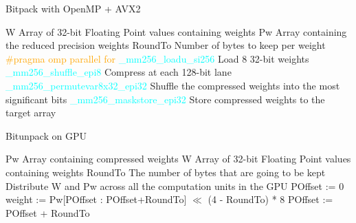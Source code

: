 
\begin{algorithm}%
\caption{Bitpack with OpenMP + AVX2}
\label{alg:bitpack_omp_avx}
{\fontsize{9}{9}\selectfont
\begin{algorithmic}[1]
    \State W
    \Comment Array of 32-bit Floating Point values containing weights
    \State Pw
    \Comment Array containing the reduced precision weights
    \State RoundTo
    \Comment Number of bytes to keep per weight
    \State \textcolor{orange} {\#pragma omp parallel for} %
        \State \textcolor{cyan}{\_mm256\_loadu\_si256}
        \Comment Load 8 32-bit weights 
        \State \textcolor{cyan}{\_mm256\_shuffle\_epi8}
        \Comment Compress at each 128-bit lane
        \State \textcolor{cyan}{\_mm256\_permutevar8x32\_epi32}
        \Comment Shuffle the compressed weights into the most significant bits
        \State \textcolor{cyan}{\_mm256\_maskstore\_epi32}
        \Comment Store compressed weights to the target array
    \EndFor
\end{algorithmic}
}
\end{algorithm}

\begin{algorithm}%
\caption{Bitunpack on GPU}
\label{alg:bitunpack}
{\fontsize{9}{9}\selectfont
\begin{algorithmic}[1]
    \State Pw
    \Comment Array containing compressed weights
    \State W
    \Comment Array of 32-bit Floating Point values containing weights
    \State RoundTo
    \Comment The number of bytes that are going to be kept
    \State Distribute W and Pw across all the computation units in the GPU
        \State POffset := 0
            \State weight := Pw[POffset : POffset+RoundTo] $\ll$ (4 - RoundTo) * 8
            \State POffset := POffset + RoundTo
        \EndFor
    \EndFor
\end{algorithmic}
}
\end{algorithm}

